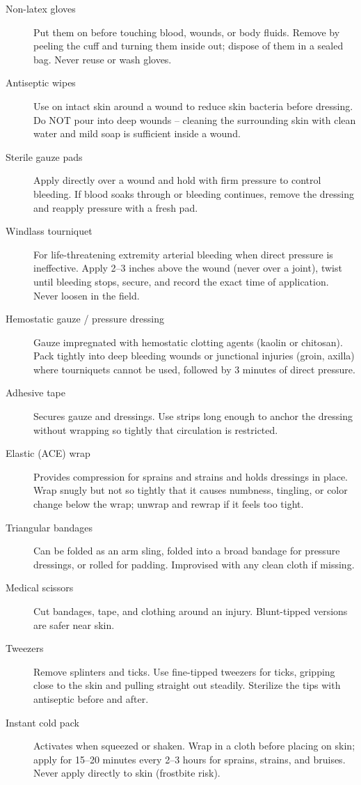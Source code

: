 \begin{description}
  \item[Non-latex gloves] Put them on before touching blood, wounds, or body fluids. Remove by peeling the cuff and turning them inside out; dispose of them in a sealed bag. Never reuse or wash gloves.
  \item[Antiseptic wipes] Use on intact skin around a wound to reduce skin bacteria before dressing. Do NOT pour into deep wounds -- cleaning the surrounding skin with clean water and mild soap is sufficient inside a wound.
  \item[Sterile gauze pads] Apply directly over a wound and hold with firm pressure to control bleeding. If blood soaks through or bleeding continues, remove the dressing and reapply pressure with a fresh pad.
  \item[Windlass tourniquet] For life-threatening extremity arterial bleeding when direct pressure is ineffective. Apply 2--3 inches above the wound (never over a joint), twist until bleeding stops, secure, and record the exact time of application. Never loosen in the field.
  \item[Hemostatic gauze / pressure dressing] Gauze impregnated with hemostatic clotting agents (kaolin or chitosan). Pack tightly into deep bleeding wounds or junctional injuries (groin, axilla) where tourniquets cannot be used, followed by 3 minutes of direct pressure.
  \item[Adhesive tape] Secures gauze and dressings. Use strips long enough to anchor the dressing without wrapping so tightly that circulation is restricted.
  \item[Elastic (ACE) wrap] Provides compression for sprains and strains and holds dressings in place. Wrap snugly but not so tightly that it causes numbness, tingling, or color change below the wrap; unwrap and rewrap if it feels too tight.
  \item[Triangular bandages] Can be folded as an arm sling, folded into a broad bandage for pressure dressings, or rolled for padding. Improvised with any clean cloth if missing.
  \item[Medical scissors] Cut bandages, tape, and clothing around an injury. Blunt-tipped versions are safer near skin.
  \item[Tweezers] Remove splinters and ticks. Use fine-tipped tweezers for ticks, gripping close to the skin and pulling straight out steadily. Sterilize the tips with antiseptic before and after.
  \item[Instant cold pack] Activates when squeezed or shaken. Wrap in a cloth before placing on skin; apply for 15--20 minutes every 2--3 hours for sprains, strains, and bruises. Never apply directly to skin (frostbite risk).

\end{description}
